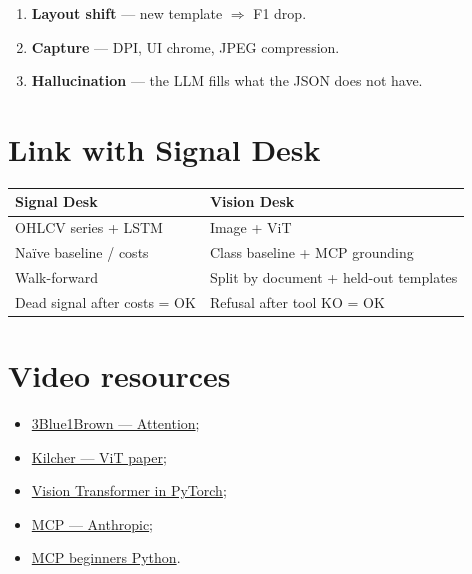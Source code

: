 \documentclass[11pt,a4paper]{article}
\begin{document}
\begin{enumerate}
  \item \textbf{Layout shift} --- new template $\Rightarrow$ F1 drop.
  \item \textbf{Capture} --- DPI, UI chrome, JPEG compression.
  \item \textbf{Hallucination} --- the LLM fills what the JSON does not have.
\end{enumerate}

\section{Link with Signal Desk}

\begin{center}
\renewcommand{\arraystretch}{1.15}
\begin{tabular}{@{}p{5.5cm}p{8.5cm}@{}}
\toprule
\textbf{Signal Desk} & \textbf{Vision Desk} \\
\midrule
OHLCV series + LSTM & Image + ViT \\
Na\"ive baseline / costs & Class baseline + MCP grounding \\
Walk-forward & Split by document + held-out templates \\
Dead signal after costs = OK & Refusal after tool KO = OK \\
\bottomrule
\end{tabular}
\end{center}

\section{Video resources}

\begin{itemize}
  \item \href{https://www.youtube.com/watch?v=eMlx5fFNoYc}{3Blue1Brown --- Attention};
  \item \href{https://www.youtube.com/watch?v=TrdevFK_am4}{Kilcher --- ViT paper};
  \item \href{https://www.youtube.com/watch?v=ovB0ddFtzzA}{Vision Transformer in PyTorch};
  \item \href{https://www.youtube.com/watch?v=CQywdSdi5iA}{MCP --- Anthropic};
  \item \href{https://www.youtube.com/watch?v=LYfr7qusVSs}{MCP beginners Python}.
\end{itemize}
\end{document}
